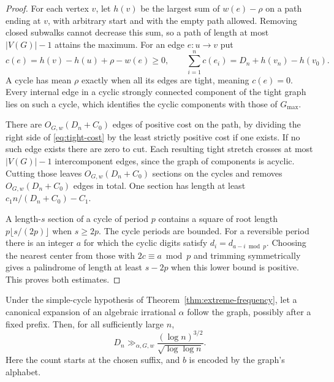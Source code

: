 \begin{proof}
For each vertex \(v\), let \(h(v)\) be the largest sum of \(w(e)-\rho\) on a path ending at \(v\), with arbitrary start and with the empty path allowed. Removing closed subwalks cannot decrease this sum, so a path of length at most \(|V(G)|-1\) attains the maximum. For an edge \(e:u\to v\) put
\[
 c(e)=h(v)-h(u)+\rho-w(e)\ge0,
 \qquad
 \sum_{i=1}^n c(e_i)=D_n+h(v_n)-h(v_0).                         \tag{*}
 \label{eq:tight-cost}
\]
A cycle has mean \(\rho\) exactly when all its edges are tight, meaning \(c(e)=0\). Every internal edge in a cyclic strongly connected component of the tight graph lies on such a cycle, which identifies the cyclic components with those of \(G_{\max}\).

There are \(O_{G,w}(D_n+C_0)\) edges of positive cost on the path, by dividing the right side of \eqref{eq:tight-cost} by the least strictly positive cost if one exists. If no such edge exists there are zero to cut. Each resulting tight stretch crosses at most \(|V(G)|-1\) intercomponent edges, since the graph of components is acyclic. Cutting those leaves \(O_{G,w}(D_n+C_0)\) sections on the cycles and removes \(O_{G,w}(D_n+C_0)\) edges in total. One section has length at least \(c_1 n/(D_n+C_0)-C_1\).

A length-\(s\) section of a cycle of period \(p\) contains a square of root length \(p\lfloor s/(2p)\rfloor\) when \(s\ge2p\). The cycle periods are bounded. For a reversible period there is an integer \(a\) for which the cyclic digits satisfy \(d_i=d_{a-i\bmod p}\). Choosing the nearest center from those with \(2c\equiv a\bmod p\) and trimming symmetrically gives a palindrome of length at least \(s-2p\) when this lower bound is positive. This proves both estimates.
\end{proof}

\begin{theorem}\label{thm:extreme-arithmetic}
Under the simple-cycle hypothesis of Theorem~\ref{thm:extreme-frequency}, let a canonical expansion of an algebraic irrational \(\alpha\) follow the graph, possibly after a fixed prefix. Then, for all sufficiently large \(n\),
\[
                 D_n\gg_{\alpha,G,w}
                 \frac{(\log n)^{3/2}}{\sqrt{\log\log n}} .
\]
Here the count starts at the chosen suffix, and \(b\) is encoded by the graph's alphabet.
\end{theorem}

